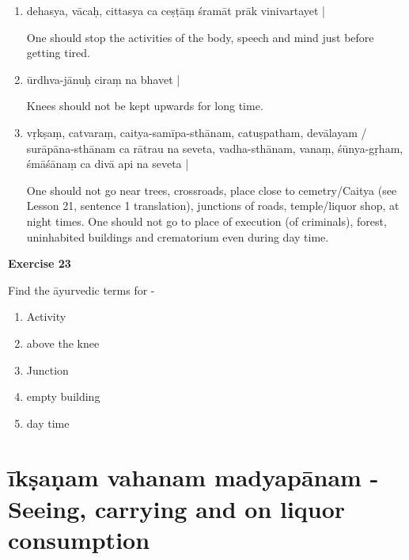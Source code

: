 \begin{enumerate}
\item {}

dehasya, vācaḥ, cittasya ca ceṣṭāṃ śramāt prāk vinivartayet | 

One should stop the activities of the body, speech and mind just before getting tired. 

\item {}

ūrdhva-jānuḥ ciraṃ na bhavet | 

Knees should not be kept upwards for long time. 

\item {}

vṛkṣaṃ, catvaraṃ, caitya-samīpa-sthānam, catuṣpatham, devālayam / surāpāna-sthānam ca rātrau na seveta,  vadha-sthānam, vanaṃ, śūnya-gṛham, śmāśānaṃ ca divā api na seveta |      

One should not go near trees, crossroads, place close to cemetry/Caitya (see Lesson 21, sentence 1 translation), junctions of roads, temple/liquor shop, at night times. One should not go to place of execution (of criminals), forest, uninhabited  buildings and crematorium even during day time.
\end{enumerate}

\begin{center}
\textbf{\large Exercise 23}
\end{center}

Find the āyurvedic terms for -
\begin{enumerate}
\renewcommand{\theenumi}{\alph{enumi}}
\renewcommand{\labelenumi}{\theenumi.}
\item Activity
\item above the knee
\item Junction
\item empty building 
\item day time
\end{enumerate}

\chapter{īkṣaṇam vahanam madyapānam - Seeing, carrying and on liquor consumption}

